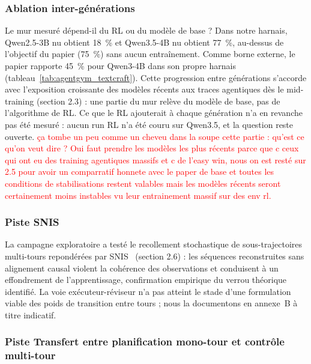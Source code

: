 \documentclass[11pt,a4paper]{article}
\begin{document}
\subsubsection{Ablation inter-générations}

Le mur mesuré dépend-il du RL ou du modèle de base ? Dans notre harnais, Qwen2.5-3B nu obtient 18~\% et Qwen3.5-4B nu obtient 77~\%, au-dessus de l'objectif du papier (75~\%) sans aucun entraînement. Comme borne externe, le papier rapporte 45~\% pour Qwen3-4B dans son propre harnais~\cite{xi_agentgym-rl_2025} (tableau~\ref{tab:agentgym_textcraft}). Cette progression entre générations s'accorde avec l'exposition croissante des modèles récents aux traces agentiques dès le mid-training (section 2.3) : une partie du mur relève du modèle de base, pas de l'algorithme de RL. Ce que le RL ajouterait à chaque génération n'a en revanche pas été mesuré : aucun run RL n'a été couru sur Qwen3.5, et la question reste ouverte. \textcolor{red}{ça tombe un peu comme un cheveu dans la soupe cette partie : qu'est ce qu'on veut dire ? Oui faut prendre les modèles les plus récents parce que c ceux qui ont eu des training agentiques massifs et c de l'easy win, nous on est resté sur 2.5 pour avoir un comparratif honnete avec le paper de base et toutes les conditions de stabilisations restent valables mais les modèles récents seront certainement moins instables vu leur entrainement massif sur des env rl.}

\subsubsection{Piste SNIS}

La campagne exploratoire a testé le recollement stochastique de sous-trajectoires multi-tours repondérées par SNIS~\cite{owen2013montecarlo} (section 2.6) : les séquences reconstruites sans alignement causal violent la cohérence des observations et conduisent à un effondrement de l'apprentissage, confirmation empirique du verrou théorique identifié. La voie exécuteur-réviseur n'a pas atteint le stade d'une formulation viable des poids de transition entre tours ; nous la documentons en annexe~B à titre indicatif.

\subsubsection{Piste Transfert entre planification mono-tour et contrôle multi-tour}
\end{document}
